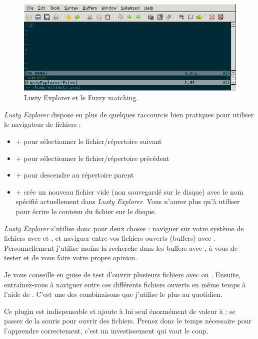 \begin{figure}%
  \includegraphics[width=\linewidth]{graphics/vim-lusty-fuzzy.png}
  \caption{Lusty Explorer et le Fuzzy matching.}
  \label{fig:vim-lusty-fuzzy}
\end{figure}

\emph{Lusty Explorer} dispose en plus de quelques raccourcis bien pratiques pour utiliser le navigateur de fichiers :

\begin{itemize}
    \item \tctrl + \tn\xspace pour sélectionner le fichier/répertoire suivant
    \item \tctrl + \tp pour sélectionner le fichier/répertoire précédent
    \item \tctrl + \tw pour descendre au répertoire parent
    \item \tctrl + \te crée un nouveau fichier vide (non sauvegardé sur le disque) avec le nom spécifié actuellement dans \emph{Lusty Explorer}. Vous n'aurez plus qu'à utiliser  pour écrire le contenu du fichier sur le disque.
\end{itemize}

\emph{Lusty Explorer} s'utilise donc pour deux choses : naviguer sur votre système de fichiers avec  et , et naviguer entre vos fichiers ouverts (buffers) avec . Personnellement j'utilise moins la recherche dans les buffers avec , à vous de tester et de vous faire votre propre opinion.

Je vous conseille en guise de test d'ouvrir plusieurs fichiers avec  ou . Ensuite, entraînez-vous à naviguer entre ces différents fichiers ouverts en même temps à l'aide de . C'est une des combinaisons que j'utilise le plus au quotidien.

Ce plugin est indispensable et ajoute à lui seul énormément de valeur à \vim : se passer de la souris pour ouvrir des fichiers. Prenez donc le temps nécessaire pour l'apprendre correctement, c'est un investissement qui vaut le coup.

